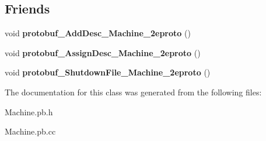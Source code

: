 \subsection*{Friends}
\begin{DoxyCompactItemize}
\item 
void {\bfseries protobuf\+\_\+\+Add\+Desc\+\_\+\+Machine\+\_\+2eproto} ()\hypertarget{classmachines_1_1machinelist_ab588f006d8ec48121b79de6050e1f8a3}{}\label{classmachines_1_1machinelist_ab588f006d8ec48121b79de6050e1f8a3}

\item 
void {\bfseries protobuf\+\_\+\+Assign\+Desc\+\_\+\+Machine\+\_\+2eproto} ()\hypertarget{classmachines_1_1machinelist_a4615177ebb310c1aa54ad33e1bf40d43}{}\label{classmachines_1_1machinelist_a4615177ebb310c1aa54ad33e1bf40d43}

\item 
void {\bfseries protobuf\+\_\+\+Shutdown\+File\+\_\+\+Machine\+\_\+2eproto} ()\hypertarget{classmachines_1_1machinelist_abdd3c852817cdd7a28aeb79f6757bde2}{}\label{classmachines_1_1machinelist_abdd3c852817cdd7a28aeb79f6757bde2}

\end{DoxyCompactItemize}


The documentation for this class was generated from the following files\+:\begin{DoxyCompactItemize}
\item 
Machine.\+pb.\+h\item 
Machine.\+pb.\+cc\end{DoxyCompactItemize}
